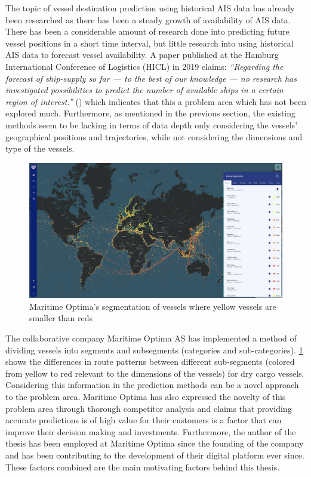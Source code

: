 The topic of vessel destination prediction using historical AIS data has already been researched as there has been a steady growth of availability of AIS data. There has been a considerable amount of research done into predicting future vessel positions in a short time interval, but little research into using historical AIS data to forecast vessel availability. A paper published at the Hamburg International Conference of Logistics (HICL) in 2019 claims: \textit{“Regarding the forecast of ship-supply so far --- to the best of our knowledge --- no research has investigated possibilities to predict the number of available ships in a certain region of interest.”} (\cite{lechtenberg2019}) which indicates that this a problem area which has not been explored much. Furthermore, as mentioned in the previous section, the existing methods seem to be lacking in terms of data depth only considering the vessels’ geographical positions and trajectories, while not considering the dimensions and type of the vessels.

\begin{figure}[htbp]  %
    \centering
    \includegraphics[width=.89\textwidth]{figures/segment_map}
    \caption{Maritime Optima’s segmentation of vessels where yellow vessels are smaller than reds}
    \label{fig:segment_map}
\end{figure}

The collaborative company Maritime Optima AS has implemented a method of dividing vessels into segments and subsegments (categories and sub-categories). \cref{fig:segment_map} shows the differences in route patterns between different sub-segments (colored from yellow to red relevant to the dimensions of the vessels) for dry cargo vessels. Considering this information in the prediction methods can be a novel approach to the problem area. Maritime Optima has also expressed the novelty of this problem area through thorough competitor analysis and claims that providing accurate predictions is of high value for their customers is a factor that can improve their decision making and investments. Furthermore, the author of the thesis has been employed at Maritime Optima since the founding of the company and has been contributing to the development of their digital platform ever since. These factors combined are the main motivating factors behind this thesis.

